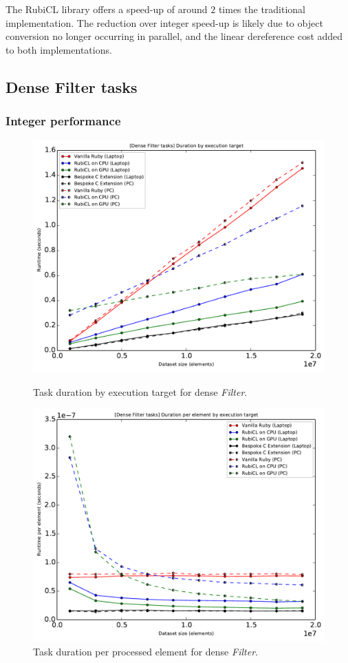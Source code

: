 The RubiCL library offers a speed-up of around $2$ times the traditional implementation. The reduction over integer speed-up is likely due to object conversion no longer occurring in parallel, and the linear dereference cost added to both implementations.


\subsection{Dense Filter tasks}
\subsubsection{Integer performance}
\begin{figure}[H]
  \centering
  \includegraphics[width=\textwidth]{./graphing/dense_filter/runtimes.pdf}
  \caption{Task duration by execution target for dense \emph{Filter}.}
  \label{fig:dfilter_task_runtime_g}

  \includegraphics[width=\textwidth]{./graphing/dense_filter/per_element.pdf}
  \caption{Task duration per processed element for dense \emph{Filter}.}
  \label{fig:dfilter_task_per_el_g}

\end{figure}

